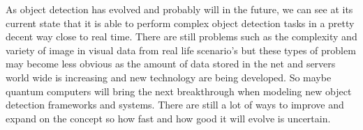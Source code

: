 
As object detection has evolved and probably will in the future, we can see at its current state that it is able to perform complex object
detection tasks in a pretty decent way close to real time. There are still problems such as the complexity and variety of image in visual
data from real life scenario's but these types of problem may become less obvious as the amount of data stored in the net and servers world
wide is increasing and new technology are being developed. So maybe  quantum computers will bring the next breakthrough when modeling new
object detection frameworks and systems. There are still a lot of ways to improve and expand on the concept so how fast and how good it will
evolve is uncertain.


